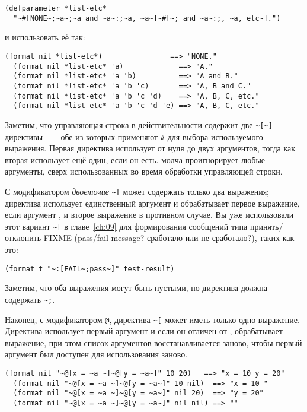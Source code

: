 \begin{lstlisting}
(defparameter *list-etc*
  "~#[NONE~;~a~;~a and ~a~:;~a, ~a~]~#[~; and ~a~:;, ~a, etc~].")
\end{lstlisting}

и использовать её так:

\begin{lstlisting}[style=lisprepl]
  (format nil *list-etc*)                ==> "NONE."
  (format nil *list-etc* 'a)             ==> "A."
  (format nil *list-etc* 'a 'b)          ==> "A and B."
  (format nil *list-etc* 'a 'b 'c)       ==> "A, B and C."
  (format nil *list-etc* 'a 'b 'c 'd)    ==> "A, B, C, etc."
  (format nil *list-etc* 'a 'b 'c 'd 'e) ==> "A, B, C, etc."
\end{lstlisting}

Заметим, что управляющая строка в действительности содержит две \lstinline!~[~]! директивы
~--- обе из которых применяют \lstinline!#! для выбора используемого выражения. Первая
директива использует от нуля до двух аргументов, тогда как вторая использует ещё один,
если он есть.  молча проигнорирует любые аргументы, сверх использованных во
время обработки управляющей строки.

С модификатором \textit{двоеточие} \lstinline!~[! может содержать только два выражения;
директива использует единственный аргумент и обрабатывает первое выражение, если аргумент
, и второе выражение в противном случае. Вы уже использовали этот вариант
\lstinline!~[! в главе~\ref{ch:09} для формирования сообщений типа принять/отклонить FIXME
  (pass/fail message? сработало или не сработало?), таких как это:

\begin{lstlisting}
(format t "~:[FAIL~;pass~]" test-result)
\end{lstlisting}

Заметим, что оба выражения могут быть пустыми, но директива должна содержать
\lstinline!~;!.

Наконец, с модификатором \lstinline!@!, директива \lstinline!~[! может иметь только одно
выражение. Директива использует первый аргумент и если он отличен от ,
обрабатывает выражение, при этом список аргументов восстанавливается заново, чтобы первый
аргумент был доступен для использования заново.

\begin{lstlisting}[style=lisprepl]
  (format nil "~@[x = ~a ~]~@[y = ~a~]" 10 20)   ==> "x = 10 y = 20"
  (format nil "~@[x = ~a ~]~@[y = ~a~]" 10 nil)  ==> "x = 10 "
  (format nil "~@[x = ~a ~]~@[y = ~a~]" nil 20)  ==> "y = 20"
  (format nil "~@[x = ~a ~]~@[y = ~a~]" nil nil) ==> ""
\end{lstlisting}

